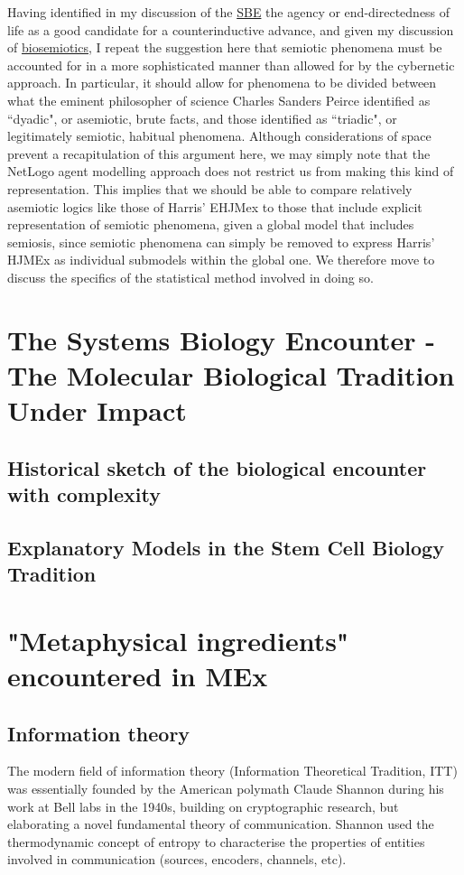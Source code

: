  Having identified in my discussion of the \hyperref[SBE]{SBE} the agency or end-directedness of life as a good candidate for a counterinductive advance, and given my discussion of \hyperref[semiosis]{biosemiotics}, I repeat the suggestion here that semiotic phenomena must be accounted for in a more sophisticated manner than allowed for by the cybernetic approach. In particular, it should allow for phenomena to be divided between what the eminent philosopher of science Charles Sanders Peirce identified as ``dyadic", or asemiotic, brute facts, and those identified as ``triadic", or legitimately semiotic, habitual phenomena. Although considerations of space prevent a recapitulation of this argument here, we may simply note that the NetLogo agent modelling approach does not restrict us from making this kind of representation. This implies that we should be able to compare relatively asemiotic logics like those of Harris' EHJMex to those that include explicit representation of semiotic phenomena, given a global model that includes semiosis, since semiotic phenomena can simply be removed to express Harris' HJMEx as individual submodels within the global one. We therefore move to discuss the specifics of the statistical method involved in doing so.
 








\section{The Systems Biology Encounter - The Molecular Biological Tradition Under Impact}
\label{SBE}


\subsection{Historical sketch of the biological encounter with complexity}
\subsection{Explanatory Models in the Stem Cell Biology Tradition}




\section{"Metaphysical ingredients" encountered in MEx}
\subsection{Information theory}
\label{ITT}
The modern field of information theory (Information Theoretical Tradition, ITT) was essentially founded by the American polymath Claude Shannon during his work at Bell labs in the 1940s, building on cryptographic research, but elaborating a novel  fundamental theory of communication. Shannon used the thermodynamic concept of entropy to characterise the properties of entities involved in communication (sources, encoders, channels, etc).

